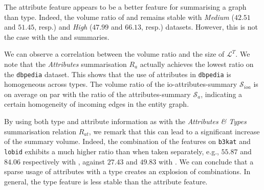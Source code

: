 The attribute feature appears to be a better feature for summarising a graph than type. Indeed, the volume ratio of  and  remains stable with \emph{Medium} ($42.51$ and $51.45$, resp.) and \emph{High} ($47.99$ and $66.13$, resp.) datasets. However, this is not the case with the  and  summaries.

We can observe a correlation between the volume ratio and the size of $\mathcal{L}^T$.
We note that the \emph{Attributes} summarisation $R_a$ actually achieves the lowest ratio on the \texttt{dbpedia} dataset. This shows that the use of attributes in \texttt{dbpedia} is homogeneous across types. The volume ratio of the \gls{io-attributes-summary} $\mathcal{S}_{ioa}$ is on average on par with the ratio of the \gls{attributes-summary} $\mathcal{S}_a$, indicating a certain homogeneity of incoming edges in the entity graph.

By using both type and attribute information as with the \emph{Attributes \& Types} summarisation relation $R_{at}$, we remark that this can lead to a significant increase of the summary volume. Indeed, the combination of the features on \texttt{b3kat} and \texttt{lobid} exhibits a much higher ratio than when taken separately, e.g., $55.87$ and $84.06$ respectively with , against $27.43$ and $49.83$ with . We can conclude that a sparse usage of attributes with a type creates an explosion of combinations. In general, the type feature is less stable than the attribute feature.


